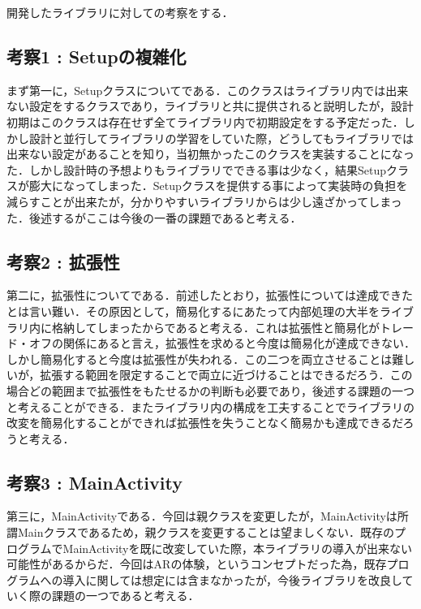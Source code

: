 開発したライブラリに対しての考察をする．
\subsection{考察1 : Setupの複雑化}
まず第一に，Setupクラスについてである．このクラスはライブラリ内では出来ない設定をするクラスであり，ライブラリと共に提供されると説明したが，設計初期はこのクラスは存在せず全てライブラリ内で初期設定をする予定だった．しかし設計と並行してライブラリの学習をしていた際，どうしてもライブラリでは出来ない設定があることを知り，当初無かったこのクラスを実装することになった．しかし設計時の予想よりもライブラリでできる事は少なく，結果Setupクラスが膨大になってしまった．Setupクラスを提供する事によって実装時の負担を減らすことが出来たが，分かりやすいライブラリからは少し遠ざかってしまった．後述するがここは今後の一番の課題であると考える．

\subsection{考察2 : 拡張性}
第二に，拡張性についてである．前述したとおり，拡張性については達成できたとは言い難い．その原因として，簡易化するにあたって内部処理の大半をライブラリ内に格納してしまったからであると考える．これは拡張性と簡易化がトレード・オフの関係にあると言え，拡張性を求めると今度は簡易化が達成できない．しかし簡易化すると今度は拡張性が失われる．この二つを両立させることは難しいが，拡張する範囲を限定することで両立に近づけることはできるだろう．この場合どの範囲まで拡張性をもたせるかの判断も必要であり，後述する課題の一つと考えることができる．またライブラリ内の構成を工夫することでライブラリの改変を簡易化することができれば拡張性を失うことなく簡易かも達成できるだろうと考える．

\subsection{考察3 : MainActivity}
第三に，MainActivityである．今回は親クラスを変更したが，MainActivityは所謂Mainクラスであるため，親クラスを変更することは望ましくない．既存のプログラムでMainActivityを既に改変していた際，本ライブラリの導入が出来ない可能性があるからだ．今回はARの体験，というコンセプトだった為，既存プログラムへの導入に関しては想定には含まなかったが，今後ライブラリを改良していく際の課題の一つであると考える．
